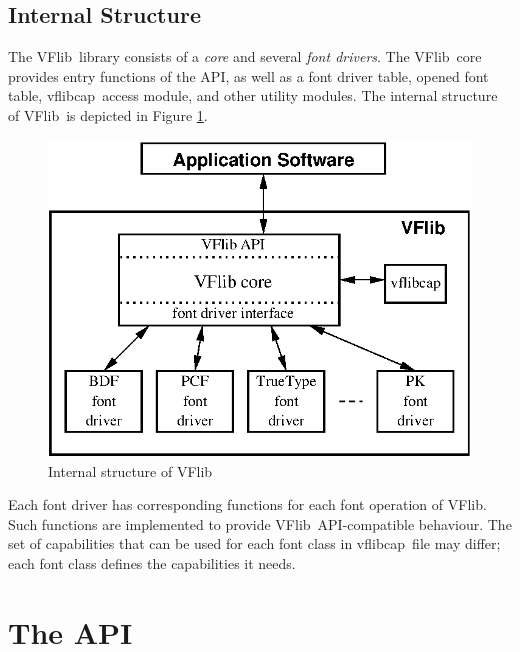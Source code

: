 \documentclass{cah-gut}
\newcommand{\pkg}[1]{\textsf{#1}}
\newcommand{\VFlib}{\pkg{VFlib}}
\newcommand{\vflibcap}{\pkg{vflibcap}}
\begin{document}
\subsection{Internal Structure}

The \VFlib\ library consists of a {\em core} and several {\em font
  drivers}.  The \VFlib\ core provides entry functions of the API, 
as well as a font driver table, opened font table, \vflibcap\ access module,
and other utility modules.  The internal structure of \VFlib\ is
depicted in Figure \ref{FIG:VFlibInternal}.

\begin{figure}
  \begin{center}
    \mbox{\includegraphics[scale=1.0]{internal.eps}}
  \end{center}
  \caption{Internal structure of \VFlib}
  \label{FIG:VFlibInternal}
\end{figure}

Each font driver has corresponding functions for each font operation
of \VFlib.  Such functions are implemented to provide \VFlib\ 
API-compatible behaviour.  
The set of capabilities that can be used for each font class 
in \vflibcap\ file may differ; each font class defines 
the capabilities it needs.



\section{The API}
\label{SEC:VFlibOfAPI}
\end{document}
